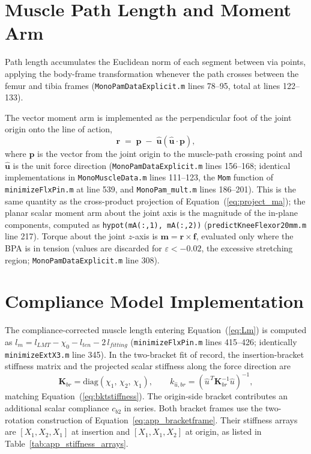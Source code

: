 \section{Muscle Path Length and Moment Arm}

Path length accumulates the Euclidean norm of each segment between via points, applying the body-frame transformation whenever the path crosses between the femur and tibia frames (\texttt{MonoPamDataExplicit.m} lines 78--95, total at lines 122--133).

The vector moment arm is implemented as the perpendicular foot of the joint origin onto the line of action,
\begin{equation}
    \mathbf{r} \;=\; \mathbf{p} \;-\; \hat{\mathbf{u}}\left(\hat{\mathbf{u}}\cdot\mathbf{p}\right),
    \label{eq:app_perpfoot}
\end{equation}
where $\mathbf{p}$ is the vector from the joint origin to the muscle-path crossing point and $\hat{\mathbf{u}}$ is the unit force direction (\texttt{MonoPamDataExplicit.m} lines 156--168; identical implementations in \texttt{MonoMuscleData.m} lines 111--123, the \texttt{Mom} function of \texttt{minimizeFlxPin.m} at line 539, and \nolinkurl{MonoPam_mult.m} lines 186--201). This is the same quantity as the cross-product projection of Equation~(\ref{eq:project_ma}); the planar scalar moment arm about the joint axis is the magnitude of the in-plane components, computed as \texttt{hypot(mA(:,1), mA(:,2))} (\texttt{predictKneeFlexor20mm.m} line 217). Torque about the joint $z$-axis is $\mathbf{m} = \mathbf{r}\times\mathbf{f}$, evaluated only where the BPA is in tension (values are discarded for $\varepsilon < -0.02$, the excessive stretching region; \texttt{MonoPamDataExplicit.m} line 308).

\section{Compliance Model Implementation}

The compliance-corrected muscle length entering Equation~(\ref{eq:Lm}) is computed as $l_{m} = l_{LMT} - \chi_{0} - l_{ten} - 2\,l_{fitting}$ (\texttt{minimizeFlxPin.m} lines 415--426; identically \texttt{minimizeExtX3.m} line 345). In the two-bracket fit of record, the insertion-bracket stiffness matrix and the projected scalar stiffness along the force direction are
\begin{equation}
    \mathbf{K}_{br} = \mathrm{diag}(\chi_{1},\,\chi_{2},\,\chi_{1}),
    \qquad
    k_{\hat{u},br} = \left(\hat{u}^{\,T}\mathbf{K}_{br}^{-1}\hat{u}\right)^{-1},
    \label{eq:app_kbr}
\end{equation}
matching Equation~(\ref{eq:bktstiffness}). The origin-side bracket contributes an additional scalar compliance $c_{b2}$ in series. Both bracket frames use the two-rotation construction of Equation~\eqref{eq:app_bracketframe}. Their stiffness arrays are $[X_1,X_2,X_1]$ at insertion and $[X_1,X_1,X_2]$ at origin, as listed in Table~\ref{tab:app_stiffness_arrays}.

